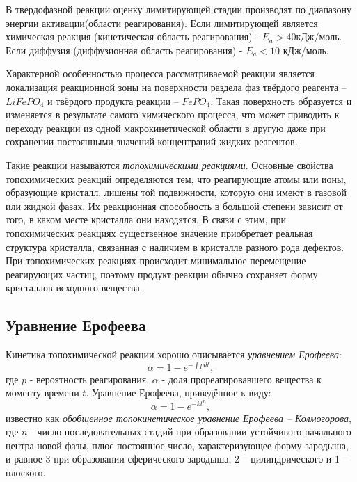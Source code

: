 \documentclass[a4paper,12pt]{article} %
\begin{document}
В твердофазной реакции оценку лимитирующей стадии производят по диапазону энергии активации(области реагирования). Если лимитирующей является химическая реакция (кинетическая область реагирования) - $E_a > 40$кДж/моль. Если диффузия (диффузионная область реагирования) - $E_a < 10$ кДж/моль.\par

Характерной особенностью процесса рассматриваемой реакции является локализация реакционной зоны на поверхности раздела фаз твёрдого реагента –  $LiFePO_4$ и твёрдого продукта реакции – $FePO_4$. Такая поверхность образуется и изменяется в результате самого химического процесса, что может приводить к переходу реакции из одной макрокинетической области в другую даже при сохранении постоянными значений концентраций жидких реагентов. 

Такие реакции называются \textit{топохимическими реакциями}. Основные свойства топохимических реакций определяются тем, что реагирующие атомы или ионы, образующие кристалл, лишены той подвижности, которую они имеют в газовой или жидкой фазах. Их реакционная способность в большой степени зависит от того, в каком месте кристалла они находятся. В связи с этим, при топохимических реакциях существенное значение приобретает реальная структура кристалла, связанная с наличием в кристалле разного рода дефектов. При топохимических реакциях происходит минимальное перемещение реагирующих частиц, поэтому продукт реакции обычно сохраняет форму кристаллов исходного вещества. \par

\subsection{Уравнение Ерофеева}
Кинетика топохимической реакции хорошо описывается \textit{уравнением Ерофеева}:
\begin{equation}
    \alpha = 1- e^{-\int p dt},
\end{equation}
где $p$ - вероятность реагирования, $\alpha$ - доля прореагировавшего вещества к моменту времени $t$. Уравнение Ерофеева, приведённое к виду: 
\begin{equation}
    \alpha = 1- e^{-kt^n},
    \label{eq:erof}
\end{equation}
известно как \textit{обобщенное топокинетическое уравнение Ерофеева – Колмогорова}, где $n$ - число последовательных стадий при образовании устойчивого начального центра новой фазы, плюс постоянное число, характеризующее форму зародыша, и равное 3 при образовании сферического зародыша, 2 – цилиндрического и 1 – плоского. 
\end{document}

